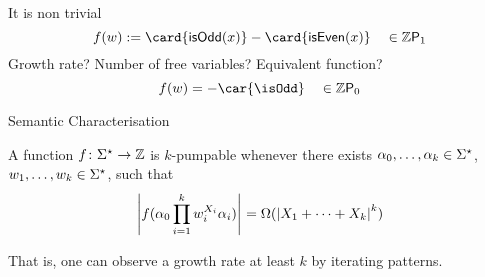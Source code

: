 \documentclass{beamer}
\begin{document}
\begin{frame}{It is non trivial}
    \begin{equation*}
        f(w) \defined
        \card{\mathsf{isOdd}(x)}
        - 
        \card{\mathsf{isEven}(x)}
        \quad 
        \in \Zpoly[1]
    \end{equation*}
    \pause
    Growth rate? Number of free variables?
    Equivalent function?
    \pause
    \begin{equation*}
        f(w) = - \car{\isOdd} \quad \in \Zpoly[0]
    \end{equation*}
\end{frame}

\begin{frame}{Semantic Characterisation}
    \begin{definition}
        A function $f \colon \words \to \Rel$ is $k$-pumpable
        whenever there exists
        $\alpha_0, \dots, \alpha_k \in \words$,
        $w_1, \dots, w_k \in \words$,
        such that 
        \begin{equation*}
            \size{f(\alpha_0 \prod_{i = 1}^k w_i^{X_i} \alpha_i)}
            = 
            \Omega(\size{X_1 + \dots + X_k}^k)
        \end{equation*}
    \end{definition}
    \pause
    That is, one can observe a growth rate at least $k$ by iterating patterns.
\end{frame}
\end{document}
